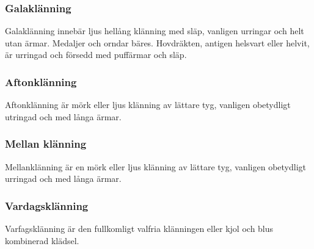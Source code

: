     \subsubsection{\textbf{Galaklänning}}
    Galaklänning innebär ljus hellång klänning med släp, vanligen urringar och helt utan ärmar. Medaljer och orndar bäres. Hovdräkten, antigen helsvart eller helvit, är urringad och försedd med puffärmar och släp.

    \subsubsection{\textbf{Aftonklänning}}
    Aftonklänning är mörk eller ljus klänning av lättare tyg, vanligen obetydligt utringad och med långa ärmar.

    \subsubsection{\textbf{Mellan klänning}}
    Mellanklänning är en mörk eller ljus klänning av lättare tyg, vanligen obetydligt urringad och med långa ärmar.

    \subsubsection{\textbf{Vardagsklänning}}
    Varfagsklänning är den fullkomligt valfria klänningen eller kjol och blus kombinerad klädsel.
    

    
    

    \newpage